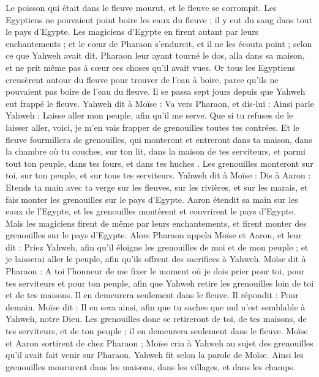 \begin{multicols}{2}
Le poisson qui était dans le fleuve mourut, et le fleuve se corrompit. Les Egyptiens ne pouvaient point boire les eaux du fleuve ; il y eut du sang dans tout le pays d'Egypte.
Les magiciens d'Egypte en firent autant par leurs enchantements ; et le cœur de Pharaon s'endurcit, et il ne les écouta point ; selon ce que Yahweh avait dit.
Pharaon leur ayant tourné le dos, alla dans sa maison, et ne prit même pas à cœur ces choses qu'il avait vues.
Or tous les Egyptiens creusèrent autour du fleuve pour trouver de l'eau à boire, parce qu'ils ne pouvaient pas boire de l'eau du fleuve.
Il se passa sept jours depuis que Yahweh eut frappé le fleuve.
Yahweh dit à Moïse : Va vers Pharaon, et dis-lui : Ainsi parle Yahweh : Laisse aller mon peuple, afin qu'il me serve.
Que si tu refuses de le laisser aller, voici, je m'en vais frapper de grenouilles toutes tes contrées.
Et le fleuve fourmillera de grenouilles, qui monteront et entreront dans ta maison, dans la chambre où tu couches, sur ton lit, dans la maison de tes serviteurs, et parmi tout ton peuple, dans tes fours, et dans tes huches .
Les grenouilles monteront sur toi, sur ton peuple, et sur tous tes serviteurs.
\VerseOne{}Yahweh dit à Moïse : Dis à Aaron : Etends ta main avec ta verge sur les fleuves, sur les rivières, et sur les marais, et fais monter les grenouilles sur le pays d'Egypte.
Aaron étendit sa main sur les eaux de l'Egypte, et les grenouilles montèrent et couvrirent le pays d'Egypte.
Mais les magiciens firent de même par leurs enchantements, et firent monter des grenouilles sur le pays d'Egypte.
Alors Pharaon appela Moïse et Aaron, et leur dit : Priez Yahweh, afin qu'il éloigne les grenouilles de moi et de mon peuple ; et je laisserai aller le peuple, afin qu'ils offrent des sacrifices à Yahweh.
Moïse dit à Pharaon : A toi l’honneur de me fixer le moment où je dois prier pour toi, pour tes serviteurs et pour ton peuple, afin que Yahweh retire les grenouilles loin de toi et de tes maisons. Il en demeurera seulement dans le fleuve.
Il répondit : Pour demain. Moïse dit : Il en sera ainsi, afin que tu saches que nul n’est semblable à Yahweh, notre Dieu.
Les grenouilles donc se retireront de toi, de tes maisons, de tes serviteurs, et de ton peuple ; il en demeurera seulement dans le fleuve.
Moïse et Aaron sortirent de chez Pharaon ; Moïse cria à Yahweh au sujet des grenouilles qu'il avait fait venir sur Pharaon.
Yahweh fit selon la parole de Moïse. Ainsi les grenouilles moururent dans les maisons, dans les villages, et dans les champs.

\end{multicols}
